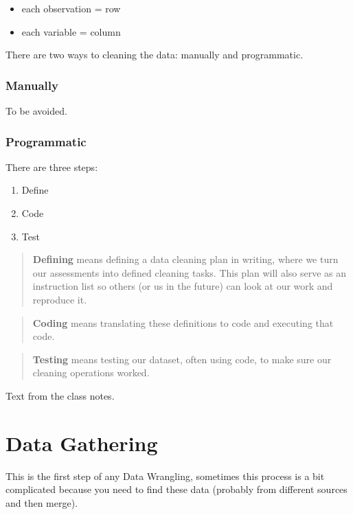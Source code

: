 \documentclass[]{book}
\providecommand{\tightlist}{%
  \setlength{\itemsep}{0pt}\setlength{\parskip}{0pt}}
\begin{document}
\begin{itemize}
\tightlist
\item
  each observation = row
\item
  each variable = column
\end{itemize}

There are two ways to cleaning the data: manually and programmatic.

\subsubsection{Manually}\label{manually}

To be avoided.

\subsubsection{Programmatic}\label{programmatic}

There are three steps:

\begin{enumerate}
\def\labelenumi{\arabic{enumi}.}
\tightlist
\item
  Define
\item
  Code
\item
  Test
\end{enumerate}

\begin{quote}
\textbf{Defining} means defining a data cleaning plan in writing, where
we turn our assessments into defined cleaning tasks. This plan will also
serve as an instruction list so others (or us in the future) can look at
our work and reproduce it.
\end{quote}

\begin{quote}
\textbf{Coding} means translating these definitions to code and
executing that code.
\end{quote}

\begin{quote}
\textbf{Testing} means testing our dataset, often using code, to make
sure our cleaning operations worked.
\end{quote}

Text from the class notes.

\section{Data Gathering}\label{data-gathering}

This is the first step of any Data Wrangling, sometimes this process is
a bit complicated because you need to find these data (probably from
different sources and then merge).
\end{document}
